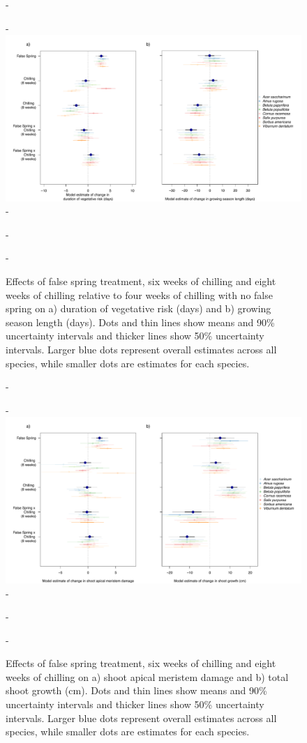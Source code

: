 \documentclass{article}\usepackage[]{graphicx}\usepackage[]{color}
\begin{document}
  {\begin{figure} [H]
  -\begin{center}
  -\includegraphics[width=18cm]{..//analyses/figures/mu_phen.pdf} 
  -\caption{Effects of false spring treatment, six weeks of chilling and eight weeks of chilling relative to four weeks of chilling with no false spring on a) duration of vegetative risk (days) and b) growing season length (days). Dots and thin lines show means and 90\% uncertainty intervals and thicker lines show 50\% uncertainty intervals. Larger blue dots represent overall estimates across all species, while smaller dots are estimates for each species. }\label{fig:muphen} %
  -\end{center}
  -\end{figure}}
  
  {\begin{figure} [H]
  -\begin{center}
  -\includegraphics[width=18cm]{..//analyses/figures/mu_growth.pdf} 
  -\caption{Effects of false spring treatment, six weeks of chilling and eight weeks of chilling on a) shoot apical meristem damage and b) total shoot growth (cm). Dots and thin lines show means and 90\% uncertainty intervals and thicker lines show 50\% uncertainty intervals. Larger blue dots represent overall estimates across all species, while smaller dots are estimates for each species. }\label{fig:mugrowth}
  -\end{center}
  -\end{figure}}
  
\end{document}
